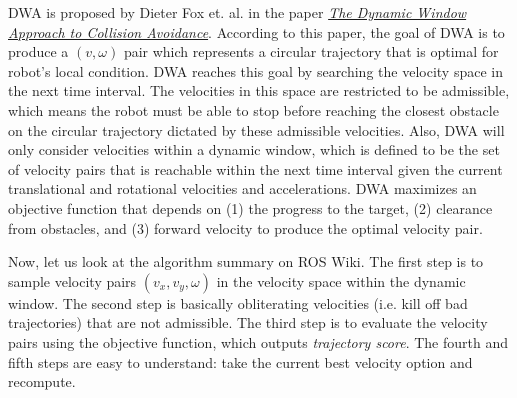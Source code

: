 \documentclass[12pt]{article}
\begin{document}
\begin{center}
\setlength{\fboxsep}{1em}
\end{center}

\noindent DWA is proposed by Dieter Fox et. al. in the paper \href{https://www.ri.cmu.edu/pub_files/pub1/fox_dieter_1997_1/fox_dieter_1997_1.pdf}{\textit{The Dynamic Window Approach to Collision Avoidance}}. According to this paper, the goal of DWA is to produce a $(v,\omega)$ pair which
represents a circular trajectory that is optimal for robot's local condition. DWA reaches this goal by searching the velocity space in the next time interval.
The velocities in this space are restricted to be admissible, which means the robot must be able to stop before reaching the closest obstacle on the
circular trajectory dictated by these admissible velocities. Also, DWA will only consider velocities within a dynamic window, which is defined to be the
set of velocity pairs that is reachable within the next time interval given the current translational and rotational velocities and accelerations. DWA maximizes an objective
function that depends on (1) the progress to the target, (2) clearance from obstacles, and (3) forward velocity to produce the optimal velocity pair.

Now, let us look at the algorithm summary on ROS Wiki. The first step is to sample velocity pairs $(v_x, v_y, \omega)$ in
the velocity space within the dynamic window. The second step is basically obliterating velocities (i.e. kill off bad trajectories) that are not admissible. The third step is
to evaluate the velocity pairs using the objective function, which outputs \textit{trajectory score}. The fourth and fifth steps are easy to understand: take the current best
velocity option and recompute.\\
\end{document}
